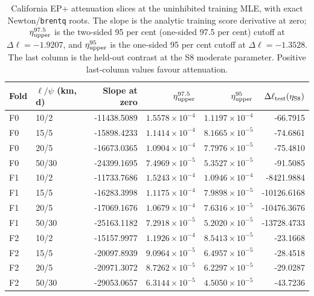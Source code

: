 \begin{table}[htbp]\centering\scriptsize
\setlength{\tabcolsep}{3pt}
\begin{tabular}{@{}llrrrr@{}}\toprule
Fold & $\ell/\psi$ (km, d) & Slope at zero & $\eta_{\rm upper}^{97.5}$ & $\eta_{\rm upper}^{95}$ & $\Delta\ell_{\rm test}(\eta_{\rm S8})$\\\midrule
F0 & 10/2 & -11438.5089 & $1.5578\times10^{-4}$ & $1.1197\times10^{-4}$ & -66.7915 \\
F0 & 15/5 & -15898.4233 & $1.1414\times10^{-4}$ & $8.1665\times10^{-5}$ & -74.6861 \\
F0 & 20/5 & -16673.0365 & $1.0904\times10^{-4}$ & $7.7976\times10^{-5}$ & -75.4810 \\
F0 & 50/30 & -24399.1695 & $7.4969\times10^{-5}$ & $5.3527\times10^{-5}$ & -91.5085 \\
F1 & 10/2 & -11733.7686 & $1.5243\times10^{-4}$ & $1.0946\times10^{-4}$ & -8421.9884 \\
F1 & 15/5 & -16283.3998 & $1.1175\times10^{-4}$ & $7.9898\times10^{-5}$ & -10126.6168 \\
F1 & 20/5 & -17069.1676 & $1.0679\times10^{-4}$ & $7.6316\times10^{-5}$ & -10476.3676 \\
F1 & 50/30 & -25163.1182 & $7.2918\times10^{-5}$ & $5.2020\times10^{-5}$ & -13728.4733 \\
F2 & 10/2 & -15157.9977 & $1.1926\times10^{-4}$ & $8.5413\times10^{-5}$ & -23.1668 \\
F2 & 15/5 & -20097.8939 & $9.0964\times10^{-5}$ & $6.4957\times10^{-5}$ & -28.4518 \\
F2 & 20/5 & -20971.3072 & $8.7262\times10^{-5}$ & $6.2297\times10^{-5}$ & -29.0287 \\
F2 & 50/30 & -29053.0657 & $6.3144\times10^{-5}$ & $4.5050\times10^{-5}$ & -43.7236 \\
\bottomrule\end{tabular}
\caption{California EP+ attenuation slices at the uninhibited training MLE, with exact Newton/\texttt{brentq} roots. The slope is the analytic training score derivative at zero; $\eta_{\rm upper}^{97.5}$ is the two-sided 95 per cent (one-sided 97.5 per cent) cutoff at $\Delta\ell=-1.9207$, and $\eta_{\rm upper}^{95}$ is the one-sided 95 per cent cutoff at $\Delta\ell=-1.3528$. The last column is the held-out contrast at the S8 moderate parameter. Positive last-column values favour attenuation.}
\label{tab:california-eta-profiles}
\end{table}

